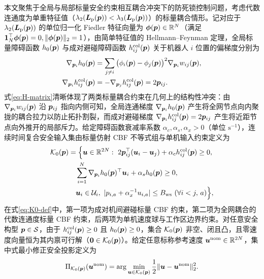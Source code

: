 本文聚焦于全局与局部标量安全约束相互耦合冲突下的防死锁控制问题，考虑代数连通度为单重特征值（$\lambda_2(\boldsymbol{L}_{\mathrm{p}}(\boldsymbol{p}))<\lambda_3(\boldsymbol{L}_{\mathrm{p}}(\boldsymbol{p}))$）的标量耦合情形。记对应于 $\lambda_2(\boldsymbol{L}_{\mathrm{p}}(\boldsymbol{p}))$ 的单位归一化 Fiedler 特征向量为 $\boldsymbol\phi(\boldsymbol{p})\in\mathbb R^N$（满足 $\boldsymbol 1_N^{\top}\boldsymbol\phi(\boldsymbol{p})=0,\lVert\boldsymbol\phi(\boldsymbol{p})\rVert_2=1$），由简单特征值的 Hellmann–Feynman 定理，全局标量障碍函数 $h_0(\boldsymbol{p})$ 与成对避碰障碍函数 $h_{ij}^{\mathrm{col}}(\boldsymbol{p})$ 关于机器人 $i$ 位置的偏梯度分别为
\begin{equation}
\begin{split}
 \nabla_{\boldsymbol{p}_i}h_0(\boldsymbol{p})&=\sum_{j\ne i}\big(\phi_i(\boldsymbol{p})-\phi_j(\boldsymbol{p})\big)^2\nabla_{\boldsymbol{p}_i}w_{ij}(\boldsymbol{p}),\\
 \nabla_{\boldsymbol{p}_i}h_{ij}^{\mathrm{col}}(\boldsymbol{p})&=-\nabla_{\boldsymbol{p}_j}h_{ij}^{\mathrm{col}}(\boldsymbol{p})=2\boldsymbol{p}_{ij}.
\end{split}
 \label{eq:H-matrix}
\end{equation}
式\eqref{eq:H-matrix}清晰体现了两类标量耦合约束在几何上的结构性冲突：由 $\nabla_{\boldsymbol{p}_i}w_{ij}(\boldsymbol{p})$ 沿 $\boldsymbol{p}_{ij}$ 指向内侧可知，全局连通梯度 $\nabla_{\boldsymbol{p}_i}h_0(\boldsymbol{p})$ 产生将全网节点向内聚拢的耦合拉力以防止拓扑割裂，而成对避碰梯度 $\nabla_{\boldsymbol{p}_i}h_{ij}^{\mathrm{col}}(\boldsymbol{p})=2\boldsymbol{p}_{ij}$ 产生将近距节点向外推开的局部斥力。给定障碍函数衰减率系数 $\alpha_c,\alpha_s,\alpha_x>0$（单位 $\mathrm s^{-1}$），连续时间复合安全输入集由标量仿射 CBF 不等式组与单机输入约束定义为
\begin{equation}
\begin{split}
 \mathcal K_0(\bp)&=\Big\{\bu\in\mathbb R^{2N}:\ 2\bp_{ij}^{\top}(\bu_i-\bu_j)+\alpha_c h_{ij}^{\mathrm{col}}(\bp)\ge 0,\\
 &\quad \sum_{i=1}^N\nabla_{\bp_i}h_0(\bp)^{\top}\bu_i+\alpha_s h_0(\bp)\ge 0,\\
 &\quad \bu_i\in\mathcal U_i,\ |p_{i,a}+\alpha_x^{-1}u_{i,a}|\le B_{\mathrm{ws}}\ (\forall i<j,\,a)\Big\},
\end{split}\label{eq:K0-def}
\end{equation}
在式\eqref{eq:K0-def}中，第一项为成对机间避碰标量 CBF 约束，第二项为全网耦合的代数连通度标量 CBF 约束，后两项为单机速度球与工作区边界约束。对任意安全构型 $\boldsymbol{p}\in\mathcal S$，由于 $h_{ij}^{\mathrm{col}}(\boldsymbol{p})\ge 0$ 且 $h_0(\boldsymbol{p})\ge 0$，集合 $\mathcal K_0(\boldsymbol{p})$ 非空、闭且凸，且零速度向量恒为其内禀可行解（$\boldsymbol 0\in\mathcal K_0(\boldsymbol{p})$）。给定任意标称参考速度 $\boldsymbol{u}^{\mathrm{nom}}\in\mathbb R^{2N}$，集中式最小修正安全投影定义为
\begin{equation}
 \Pi_{\mathcal K_0(\boldsymbol{p})}(\boldsymbol{u}^{\mathrm{nom}})=\arg\min_{\boldsymbol{u}\in\mathcal K_0(\boldsymbol{p})}\frac12\lVert\boldsymbol{u}-\boldsymbol{u}^{\mathrm{nom}}\rVert_2^2.
 \label{eq:central-proj}
\end{equation}

